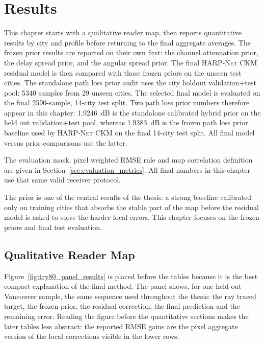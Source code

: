 \chapter{Results}
\label{chap:results}

This chapter starts with a qualitative reader map, then reports quantitative
results by city and profile before returning to the final aggregate averages.
The frozen prior results are reported on their own first: the channel
attenuation prior, the delay spread prior, and the angular spread prior. The
final \textsc{HARP-Net CKM} residual model is then compared with those frozen
priors on the unseen test cities. The standalone path loss prior audit uses the
city holdout validation+test pool: 5340 samples from 29 unseen cities. The
selected final model is evaluated on the final 2590-sample, 14-city test split.
Two path loss prior numbers therefore appear in this chapter:
\SI{1.9246}{dB} is the standalone calibrated hybrid prior on the held out
validation+test pool, whereas \SI{1.9383}{dB} is the frozen path loss prior
baseline used by \textsc{HARP-Net CKM} on the final 14-city test split. All
final model versus prior comparisons use the latter.

The evaluation mask, pixel weighted RMSE rule and map correlation definition
are given in Section~\ref{sec:evaluation_metrics}. All final numbers in this
chapter use that same valid receiver protocol.

The prior is one of the central results of the thesis: a strong baseline
calibrated only on training cities that absorbs the stable part of the map
before the residual model is asked to solve the harder local errors. This
chapter focuses on the frozen priors and final test evaluation.

\section{Qualitative Reader Map}
\label{sec:qualitative_reader_map}

Figure~\ref{fig:try80_panel_results} is placed before the tables because it is
the best compact explanation of the final method. The panel shows, for one
held out Vancouver sample, the same sequence used throughout the thesis: the
ray traced target, the frozen prior, the residual correction, the final
prediction and the remaining error. Reading the figure before the quantitative
sections makes the later tables less abstract: the reported RMSE gains are the
pixel aggregate version of the local corrections visible in the lower rows.

